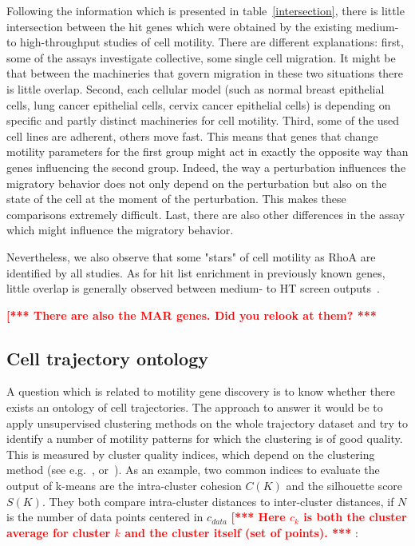 Following the information which is presented in
table~\ref{intersection}, there is little intersection between the hit
genes which were obtained by the existing medium- to high-throughput
studies of cell motility. There are different explanations: first,
some of the assays investigate collective, some single cell
migration. It might be that between the machineries that govern
migration in these two situations there is little overlap. Second,
each cellular model (such
as normal breast epithelial cells, lung cancer epithelial cells,
cervix cancer epithelial cells) is depending on specific and partly
distinct machineries for cell motility. Third, some of the used cell
lines are adherent, others move fast. This means that genes that
change motility parameters for the first group might act in exactly
the opposite way than genes influencing the second group. Indeed, the
way a perturbation influences the migratory behavior does not only
depend on the perturbation but also on the state of the cell at the
moment of the perturbation. This makes these comparisons extremely
difficult. Last, there
are also other differences in the assay which might influence the
migratory behavior. 

Nevertheless, we also observe that some "stars" of cell motility as
RhoA are identified by all studies. As for hit list enrichment in
previously known genes, little overlap is generally observed between
medium- to HT screen outputs~\cite{pmid20360735}. 

\textcolor{red}{\bf [*** There are also the MAR genes. Did you relook
  at them? ***}

\subsection{Cell trajectory ontology}
\label{sec:ontology}
A question which is related to motility gene discovery is to know
whether there exists an ontology of cell trajectories. The approach to
answer it would be to apply unsupervised clustering methods on the
whole trajectory dataset and try to identify a number of motility
patterns for which the clustering is of good quality. This is measured
by cluster quality indices, which depend on the clustering method (see
e.g.~\cite[Chapter~8]{Tan:2005:IDM:1095618}, or~\cite{Halkidi}). As an
example, two common indices to evaluate the output of k-means are the
intra-cluster cohesion $C(K)$ and the silhouette score $S(K)$. They
both compare intra-cluster distances to inter-cluster distances, if
$N$ is the number of data points centered in $c_{data}$
\textcolor{red}{\bf [*** Here $c_k$ is both the cluster average for
  cluster $k$ and the cluster itself (set of points). ***}
:


